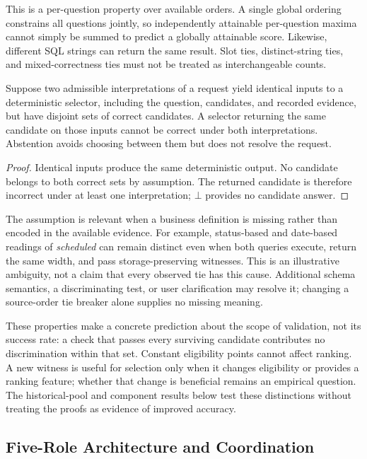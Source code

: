 \documentclass[information,article,submit,moreauthors]{Definitions/mdpi}
\begin{document}
This is a per-question property over available orders. A single global ordering constrains all questions jointly, so independently attainable per-question maxima cannot simply be summed to predict a globally attainable score. Likewise, different SQL strings can return the same result. Slot ties, distinct-string ties, and mixed-correctness ties must not be treated as interchangeable counts.

\begin{Proposition}
\label{prop:indistinguishability}
Suppose two admissible interpretations of a request yield identical inputs to a deterministic selector, including the question, candidates, and recorded evidence, but have disjoint sets of correct candidates. A selector returning the same candidate on those inputs cannot be correct under both interpretations. Abstention avoids choosing between them but does not resolve the request.
\end{Proposition}
\begin{proof}
Identical inputs produce the same deterministic output. No candidate belongs to both correct sets by assumption. The returned candidate is therefore incorrect under at least one interpretation; $\bot$ provides no candidate answer.
\end{proof}

The assumption is relevant when a business definition is missing rather than encoded in the available evidence. For example, status-based and date-based readings of \emph{scheduled} can remain distinct even when both queries execute, return the same width, and pass storage-preserving witnesses. This is an illustrative ambiguity, not a claim that every observed tie has this cause. Additional schema semantics, a discriminating test, or user clarification may resolve it; changing a source-order tie breaker alone supplies no missing meaning.

These properties make a concrete prediction about the scope of validation, not its success rate: a check that passes every surviving candidate contributes no discrimination within that set. Constant eligibility points cannot affect ranking. A new witness is useful for selection only when it changes eligibility or provides a ranking feature; whether that change is beneficial remains an empirical question. The historical-pool and component results below test these distinctions without treating the proofs as evidence of improved accuracy.

\subsection{Five-Role Architecture and Coordination}
\end{document}

